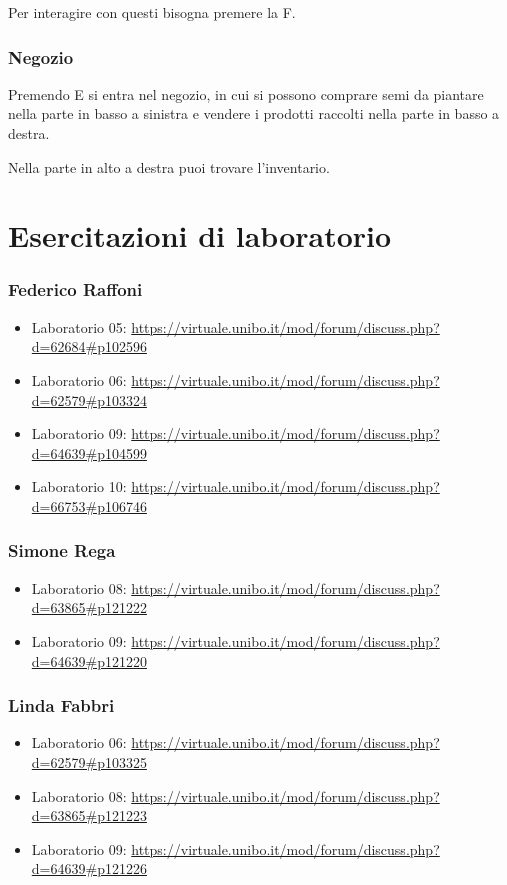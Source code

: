 \documentclass[a4paper,12pt]{report}
\begin{document}
	Per interagire con questi bisogna premere la F.
	

\subsection{Negozio}
	Premendo E si entra nel negozio, in cui si possono comprare semi da piantare nella parte in basso a sinistra e vendere i prodotti raccolti nella parte in basso a destra.
	
	Nella parte in alto a destra puoi trovare l'inventario.
	

\chapter{Esercitazioni di laboratorio}

\subsection{Federico Raffoni}

\begin{itemize}
 \item Laboratorio 05: \url{https://virtuale.unibo.it/mod/forum/discuss.php?d=62684#p102596}
 \item Laboratorio 06: \url{https://virtuale.unibo.it/mod/forum/discuss.php?d=62579#p103324}
 \item Laboratorio 09: \url{https://virtuale.unibo.it/mod/forum/discuss.php?d=64639#p104599}
 \item Laboratorio 10: \url{https://virtuale.unibo.it/mod/forum/discuss.php?d=66753#p106746}
\end{itemize}

\subsection{Simone Rega}

\begin{itemize}
	\item Laboratorio 08: \url{https://virtuale.unibo.it/mod/forum/discuss.php?d=63865#p121222}
	\item Laboratorio 09: \url{https://virtuale.unibo.it/mod/forum/discuss.php?d=64639#p121220}
\end{itemize}

\subsection{Linda Fabbri}

\begin{itemize}
	\item Laboratorio 06:
	\url{https://virtuale.unibo.it/mod/forum/discuss.php?d=62579#p103325}
	\item Laboratorio 08: \url{https://virtuale.unibo.it/mod/forum/discuss.php?d=63865#p121223}
	\item Laboratorio 09: \url{https://virtuale.unibo.it/mod/forum/discuss.php?d=64639#p121226}
\end{itemize}
\end{document}
